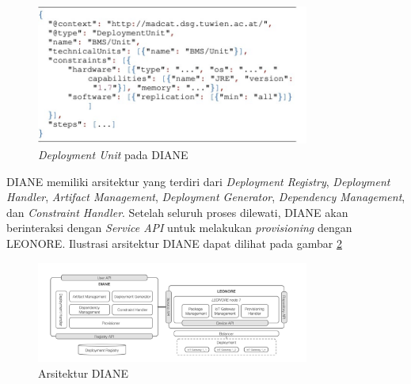 \begin{figure}[ht]
  \centering
  \includegraphics[width=0.8\textwidth]{resources/chapter-2/diane-deployment-unit.jpg}
  \caption{\textit{Deployment Unit} pada DIANE \parencite{vogler2015diane}}
  \label{fig:diane-du}
\end{figure}

DIANE memiliki arsitektur yang terdiri dari \textit{Deployment Registry}, \textit{Deployment Handler}, \textit{Artifact Management}, \textit{Deployment Generator}, \textit{Dependency Management}, dan \textit{Constraint Handler}. Setelah seluruh proses dilewati, DIANE akan berinteraksi dengan \textit{Service API} untuk melakukan \textit{provisioning} dengan LEONORE. Ilustrasi arsitektur DIANE dapat dilihat pada gambar \ref{fig:diane-arch}

\begin{figure}[ht]
  \centering
  \includegraphics[width=0.8\textwidth]{resources/chapter-2/diane-architecture.jpg}
  \caption{Arsitektur DIANE \parencite{vogler2015diane}}
  \label{fig:diane-arch}
\end{figure}